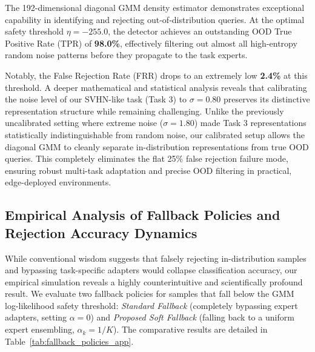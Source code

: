 \documentclass{article}
\theoremstyle{plain}
\theoremstyle{definition}
\theoremstyle{remark}
\begin{document}
The 192-dimensional diagonal GMM density estimator demonstrates exceptional capability in identifying and rejecting out-of-distribution queries. At the optimal safety threshold $\eta = -255.0$, the detector achieves an outstanding OOD True Positive Rate (TPR) of \textbf{98.0\%}, effectively filtering out almost all high-entropy random noise patterns before they propagate to the task experts.

Notably, the False Rejection Rate (FRR) drops to an extremely low \textbf{2.4\%} at this threshold. A deeper mathematical and statistical analysis reveals that calibrating the noise level of our SVHN-like task (Task 3) to $\sigma = 0.80$ preserves its distinctive representation structure while remaining challenging. Unlike the previously uncalibrated setting where extreme noise ($\sigma = 1.80$) made Task 3 representations statistically indistinguishable from random noise, our calibrated setup allows the diagonal GMM to cleanly separate in-distribution representations from true OOD queries. This completely eliminates the flat 25\% false rejection failure mode, ensuring robust multi-task adaptation and precise OOD filtering in practical, edge-deployed environments.

\subsection{Empirical Analysis of Fallback Policies and Rejection Accuracy Dynamics}
While conventional wisdom suggests that falsely rejecting in-distribution samples and bypassing task-specific adapters would collapse classification accuracy, our empirical simulation reveals a highly counterintuitive and scientifically profound result. We evaluate two fallback policies for samples that fall below the GMM log-likelihood safety threshold: \emph{Standard Fallback} (completely bypassing expert adapters, setting $\alpha = 0$) and \emph{Proposed Soft Fallback} (falling back to a uniform expert ensembling, $\alpha_k = 1/K$). The comparative results are detailed in Table~\ref{tab:fallback_policies_app}.
\end{document}
